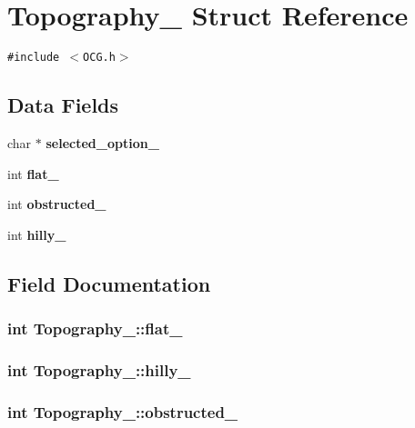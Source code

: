 \section{Topography\_\- Struct Reference}
\label{structTopography__}
{\tt \#include $<$OCG.h$>$}

\subsection*{Data Fields}
\begin{CompactItemize}
\item 
char $\ast$ {\bf selected\_\-option\_\-}
\item 
int {\bf flat\_\-}
\item 
int {\bf obstructed\_\-}
\item 
int {\bf hilly\_\-}
\end{CompactItemize}


\subsection{Field Documentation}
\subsubsection[{flat\_\-}]{\setlength{\rightskip}{0pt plus 5cm}int {\bf Topography\_\-::flat\_\-}}\label{structTopography___77dc65fbd4004358b5a73001e04e04f2}


\subsubsection[{hilly\_\-}]{\setlength{\rightskip}{0pt plus 5cm}int {\bf Topography\_\-::hilly\_\-}}\label{structTopography___40338db50fd173a5374dfdcac1dfbd3b}


\subsubsection[{obstructed\_\-}]{\setlength{\rightskip}{0pt plus 5cm}int {\bf Topography\_\-::obstructed\_\-}}\label{structTopography___a96c1a9c2e6f58eec53e459744578b07}


